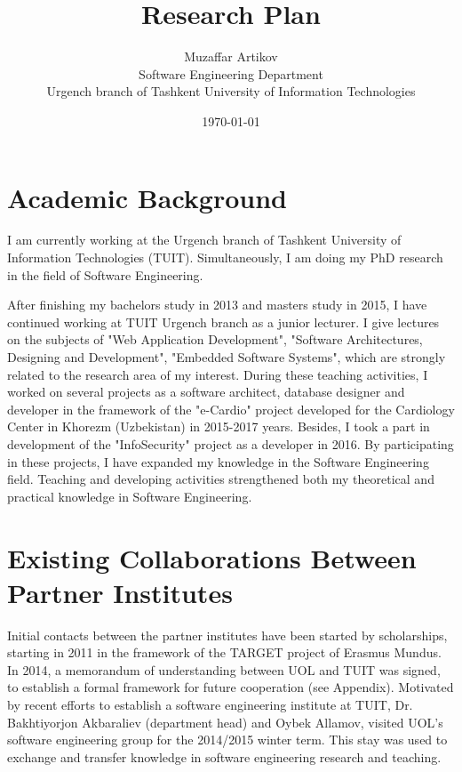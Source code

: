 \documentclass[10pt, oneside]{article}
\title{Research Plan}
\author{Muzaffar Artikov\\
Software Engineering Department\\
Urgench branch of Tashkent University of Information Technologies}
\date{\today}
\begin{document}
\maketitle

\section{Academic Background}
I am currently working at the Urgench branch of Tashkent University of Information Technologies (TUIT). Simultaneously, I am doing my PhD research in the field of Software Engineering. 

After finishing my bachelors study in 2013 and masters study in 2015, I have continued working at TUIT Urgench branch as a junior lecturer. I give lectures on the subjects of "Web Application Development", "Software Architectures, Designing and Development", "Embedded Software Systems", which are strongly related to the research area of my interest. During these teaching activities, I worked on several projects as a software architect, database designer and developer in the framework of the "e-Cardio" project developed for the Cardiology Center in Khorezm (Uzbekistan) in 2015-2017 years. Besides, I took a part in development of the "InfoSecurity" project as a developer in 2016. By participating in these projects, I have expanded my knowledge in the Software Engineering field. Teaching and developing activities strengthened both my theoretical and practical knowledge in Software Engineering.

\section{Existing Collaborations Between Partner Institutes}
Initial contacts between the partner institutes have been started by scholarships, starting in 2011 in the framework of the TARGET project of Erasmus Mundus. In 2014, a memorandum of understanding between UOL and TUIT was signed, to establish a formal framework for future cooperation (see Appendix). Motivated by recent efforts to establish a software engineering institute at TUIT, Dr. Bakhtiyorjon Akbaraliev (department head) and Oybek Allamov, visited UOL’s software engineering group for the 2014/2015 winter term. This stay was used to exchange and transfer knowledge in software engineering research and teaching.
\end{document}
